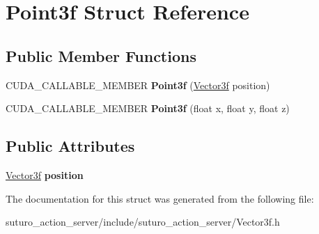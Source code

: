 \hypertarget{structPoint3f}{\section{Point3f Struct Reference}
\label{structPoint3f}
}
\subsection*{Public Member Functions}
\begin{DoxyCompactItemize}
\item 
\hypertarget{structPoint3f_afd855b46743178dd71288f04512e2c57}{C\-U\-D\-A\-\_\-\-C\-A\-L\-L\-A\-B\-L\-E\-\_\-\-M\-E\-M\-B\-E\-R {\bfseries Point3f} (\hyperlink{structVector3f}{Vector3f} position)}\label{structPoint3f_afd855b46743178dd71288f04512e2c57}

\item 
\hypertarget{structPoint3f_a576c4266e9d7259d801d010fdbbc3306}{C\-U\-D\-A\-\_\-\-C\-A\-L\-L\-A\-B\-L\-E\-\_\-\-M\-E\-M\-B\-E\-R {\bfseries Point3f} (float x, float y, float z)}\label{structPoint3f_a576c4266e9d7259d801d010fdbbc3306}

\end{DoxyCompactItemize}
\subsection*{Public Attributes}
\begin{DoxyCompactItemize}
\item 
\hypertarget{structPoint3f_a7fb9233f46ef9edbcb2c74a83a7828f9}{\hyperlink{structVector3f}{Vector3f} {\bfseries position}}\label{structPoint3f_a7fb9233f46ef9edbcb2c74a83a7828f9}

\end{DoxyCompactItemize}


The documentation for this struct was generated from the following file\-:\begin{DoxyCompactItemize}
\item 
suturo\-\_\-action\-\_\-server/include/suturo\-\_\-action\-\_\-server/Vector3f.\-h\end{DoxyCompactItemize}
